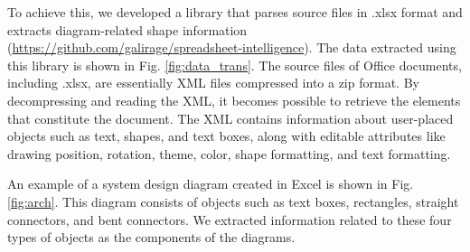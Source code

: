 To achieve this, we developed a library that parses source files in .xlsx format and extracts diagram-related shape information (\url{https://github.com/galirage/spreadsheet-intelligence}). The data extracted using this library is shown in Fig. \ref{fig:data_trans}. The source files of Office documents, including .xlsx, are essentially XML files compressed into a zip format. By decompressing and reading the XML, it becomes possible to retrieve the elements that constitute the document. The XML contains information about user-placed objects such as text, shapes, and text boxes, along with editable attributes like drawing position, rotation, theme, color, shape formatting, and text formatting.

An example of a system design diagram created in Excel is shown in Fig. \ref{fig:arch}. This diagram consists of objects such as text boxes, rectangles, straight connectors, and bent connectors. We extracted information related to these four types of objects as the components of the diagrams.


